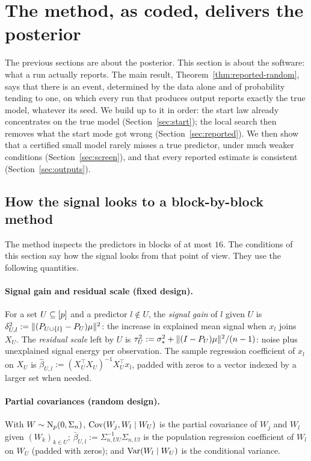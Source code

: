 \section{The method, as coded, delivers the posterior}\label{sec:delivery}

The previous sections are about the posterior. This section is about the software: what a run actually reports. The main
result, Theorem~\ref{thm:reported-random}, says that there is an event, determined by the data alone and of probability
tending to one, on which every run that produces output reports exactly the true model, whatever its seed. We build up to it in order: the start law already
concentrates on the true model (Section~\ref{sec:start}); the local search then removes what the start mode got wrong
(Section~\ref{sec:reported}). We then show that a certified small model rarely misses a true predictor, under much weaker
conditions (Section~\ref{sec:screen}), and that every reported estimate is consistent (Section~\ref{sec:outputs}).

\subsection{How the signal looks to a block-by-block method}\label{sec:delivery-quantities}

The method inspects the predictors in blocks of at most $16$. The conditions of this section say how the signal looks
from that point of view. They use the following quantities.

\paragraph{Signal gain and residual scale (fixed design).} For a set $U\subseteq[p]$ and a predictor $l\notin U$,
the \emph{signal gain} of $l$ given $U$ is $\delta^2_{U,l}:=\lVert (P_{U\cup\{l\}}-P_U)\mu\rVert^2$: the increase in explained
mean signal when $x_l$ joins $X_U$. The \emph{residual scale} left by $U$ is
$\tau^2_U:=\sigma_*^2+\lVert (I-P_U)\mu\rVert^2/(n-1)$: noise plus unexplained signal energy per observation. The sample
regression coefficient of $x_l$ on $X_U$ is $\hat\beta_{U,l}:=(X_U^\top X_U)^{-1}X_U^\top x_l$, padded with zeros to a
vector indexed by a larger set when needed.

\paragraph{Partial covariances (random design).} With $W\sim\mathrm{N}_p(0,\Sigma_n)$, $\operatorname{Cov}(W_j,W_l\mid W_U)$ is the partial
covariance of $W_j$ and $W_l$ given $(W_k)_{k\in U}$; $\bar\beta_{U,l}:=\Sigma_{n,UU}^{-1}\Sigma_{n,Ul}$ is the population
regression coefficient of $W_l$ on $W_U$ (padded with zeros); and $\operatorname{Var}(W_l\mid W_U)$ is the conditional variance.

